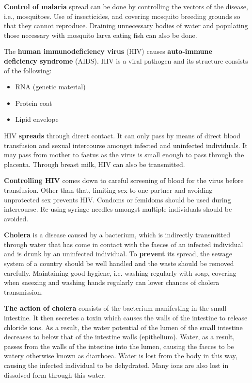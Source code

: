 \textbf{Control of malaria} spread can be done by controlling the vectors of the disease, i.e.,
mosquitoes. Use of insecticides, and covering mosquito breeding grounds so that they cannot
reproduce. Draining unnecessary bodies of water and populating those necessary with mosquito
larva eating fish can also be done.

The \textbf{human immunodeficiency virus} (HIV) causes \textbf{auto-immune deficiency syndrome} 
(AIDS). HIV is a viral pathogen and its structure consists of the following:
\begin{itemize}
	\item RNA (genetic material)
	\item Protein coat
	\item Lipid envelope
\end{itemize}
HIV \textbf{spreads} through direct contact. It can only pass by means of direct blood transfusion
and sexual intercourse amongst infected and uninfected individuals. It may pass from mother to
faetus as the virus is small enough to pass through the placenta. Through breast milk, HIV can also
be transmitted.

\textbf{Controlling HIV} comes down to careful screening of blood for the virus before transfusion.
Other than that, limiting sex to one partner and avoiding unprotected sex prevents HIV. Condoms or
femidoms should be used during intercourse. Re-using syringe needles amongst multiple individuals 
should be avoided.

\textbf{Cholera} is a disease caused by a bacterium, which is indirectly transmitted through water 
that has come in contact with the faeces of an infected individual and is drunk by an uninfected
individual. 
To \textbf{prevent} its spread, the sewage system of a country should be well handled
and the waste should be removed carefully. Maintaining good hygiene, i.e. washing regularly
with soap, covering when sneezing and washing hands regularly can lower chances of cholera 
transmission.

\textbf{The action of cholera} consists of the bacterium manifesting in the small intestine. It 
then secretes a toxin which causes the walls of the intestine to release chloride ions. As a 
result, the water potential of the lumen of the small intestine decreases to below that of the
intestine walls (epithelium). Water, as a result, passes from the walls of the intestine into the
lumen, causing the faeces to be watery otherwise known as diarrhoea. Water is lost from the body
in this way, causing the infected individual to be dehydrated. Many ions are also lost in dissolved
form through this water.

